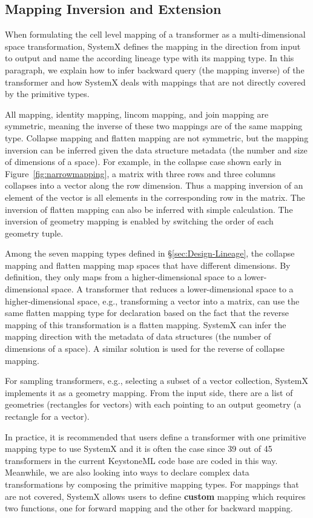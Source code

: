 \documentclass{sig-alternate}
\begin{document}
\subsection{Mapping Inversion and Extension}
When formulating the cell level mapping of a transformer as a multi-dimensional space transformation, SystemX defines
the mapping in the direction from input to output and name the according lineage type with its mapping type.
In this paragraph, we explain how to infer backward query (the mapping inverse) of the transformer and how SystemX deals
with mappings that are not directly covered by the primitive types.

All mapping, identity mapping, lincom mapping, and join mapping are symmetric, 
meaning the inverse of these two mappings are of the same mapping type.
Collapse mapping and flatten mapping are not symmetric, but the mapping inversion can be inferred
given the data structure metadata (the number and size of dimensions of a space). For example, 
in the collapse case shown early in Figure~\ref{fig:narrowmapping}, a matrix with three rows and three columns
collapses into a vector along the row dimension. Thus a mapping inversion of an element of the vector
is all elements in the corresponding row in the matrix. 
The inversion of flatten mapping can also be inferred with simple calculation.
The inversion of geometry mapping is enabled by switching the order of each geometry tuple.


Among the seven mapping types defined in \S\ref{sec:Design-Lineage}, the collapse mapping and flatten mapping
map spaces that have different dimensions. By definition, they only maps from a higher-dimensional space to a lower-dimensional space.
A transformer that reduces a lower-dimensional space to a higher-dimensional space, e.g., transforming a vector into a matrix, can use
the same flatten mapping type for declaration based on the fact that the reverse mapping of this transformation is a
flatten mapping. SystemX can infer the mapping direction with the metadata of data structures 
(the number of dimensions of a space). 
A similar solution is used for the reverse of collapse mapping.

For sampling transformers, e.g., selecting a subset of a vector collection, SystemX implements it as a geometry mapping.
From the input side, there are a list of geometries (rectangles for vectors) with each pointing to an output geometry (a rectangle for a vector).

In practice, it is recommended that users define a transformer with one primitive mapping type to use SystemX and it is often the case since
39 out of 45 transformers in the current KeystoneML code base are coded in this way. 
Meanwhile, we are also looking into ways to declare complex data transformations by composing the primitive mapping types.
For mappings that are not covered, SystemX allows users to define {\bf custom} mapping
which requires two functions, one for forward mapping and the other for backward mapping.
\end{document}
